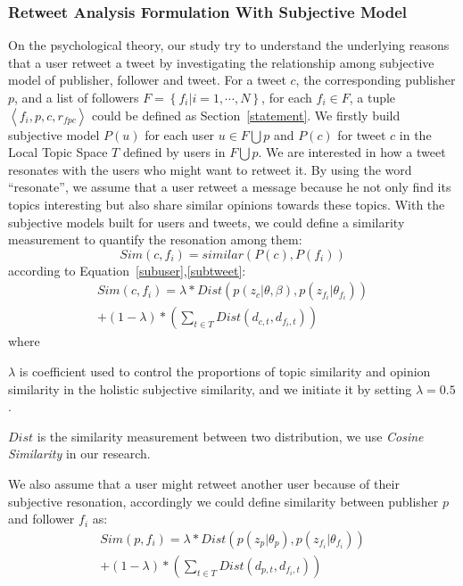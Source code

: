 \documentclass{acm_proc_article-sp}
\begin{document}
\subsubsection{Retweet Analysis Formulation With Subjective Model}
\label{formulation}
On the psychological theory, our study try to understand the underlying reasons that a user retweet a tweet by investigating the relationship among subjective model of publisher, follower and tweet. For a tweet $ c $, the corresponding publisher $ p $, and a list of followers $ F= \left\lbrace f_{i} \vert i=1, \cdots, N \right\rbrace  $, for each $ f_{i} \in F $, a tuple $ \left\langle f_{i}, p, c, r_{fpc} \right\rangle  $  could be defined as Section~\ref{statement}.
We firstly build subjective model $ P\left( u \right)  $ for each user $ u \in F \bigcup p $ and $ P\left( c \right)  $ for tweet $ c $ in the Local Topic Space $ T $ defined by users in $ F \bigcup p $. 
We are interested in how a tweet resonates with the users who might want to retweet it.
By using the word ``resonate'', we assume that a user retweet a message because he not only find its topics interesting but also share similar opinions towards these topics.
With the subjective models built for users and tweets, we could define a similarity measurement to quantify the resonation among them:\\
\begin{equation}
Sim\left( c,f_{i} \right) = similar\left( P\left( c \right), P\left( f_{i} \right) \right)
\end{equation}
according to Equation~\ref{subuser},\ref{subtweet}:
\begin{equation}
\label{tweetfollower}
\begin{split}
Sim\left( c,f_{i} \right) = \lambda \ast Dist\left( p\left( z_{c} \vert \theta, \beta \right), p\left( z_{f_{i}} \vert \theta_{f_{i}} \right) \right) \\
+\left(1-\lambda \right) \ast \left( \sum_{t \in T} Dist \left( d_{c,t}, d_{f_{i}, t} \right)  \right)
\end{split}
\end{equation}
where 
\begin{itemize*}
\item $ \lambda $ is coefficient used to control the proportions of topic similarity and opinion similarity in the holistic subjective similarity, and we initiate it by setting $ \lambda =0.5 $. 
\item $ Dist $ is the similarity measurement between two distribution, we use \emph{Cosine Similarity } in our research.
\end{itemize*}
We also assume that a user might retweet another user because of their subjective resonation, accordingly we could define similarity between publisher $ p $ and follower $ f_{i} $ as:
\begin{equation}
\label{pubfollower}
\begin{split}
Sim\left( p,f_{i} \right) = \lambda \ast Dist\left( p\left( z_{p} \vert \theta_{p} \right), p\left( z_{f_{i}} \vert \theta_{f_{i}} \right) \right) \\
+\left(1-\lambda \right) \ast \left( \sum_{t \in T} Dist \left( d_{p,t}, d_{f_{i}, t} \right)  \right)
\end{split}
\end{equation}
\end{document}
